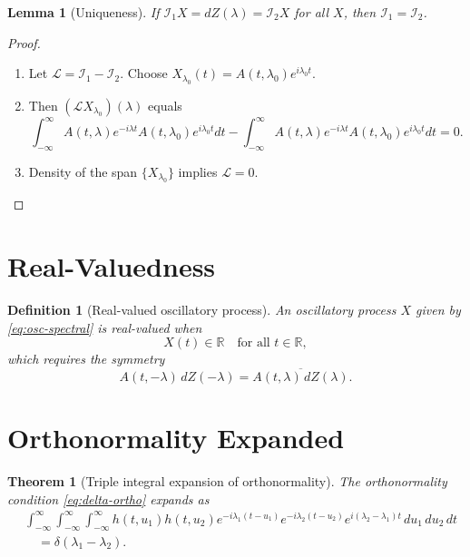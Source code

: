 \documentclass[12pt]{article}
\theoremstyle{plain}
\newtheorem{theorem}{Theorem}
\newtheorem{lemma}{Lemma}
\newtheorem{definition}{Definition}
\begin{document}
\begin{lemma}[Uniqueness]\label{lem:unique}
If $\mathcal{I}_1X = dZ(\lambda) = \mathcal{I}_2X$ for all $X$, then $\mathcal{I}_1=\mathcal{I}_2$.
\end{lemma}

\begin{proof}
\begin{enumerate}
\item Let $\mathcal{L} = \mathcal{I}_1 - \mathcal{I}_2$.  
Choose $X_{\lambda_0}(t) = A(t,\lambda_0)e^{i\lambda_0 t}$.
\item Then $(\mathcal{L}X_{\lambda_0})(\lambda)$ equals
\[
\int_{-\infty}^\infty A(t,\lambda) e^{-i\lambda t}A(t,\lambda_0)e^{i\lambda_0 t} dt -
\int_{-\infty}^\infty A(t,\lambda) e^{-i\lambda t}A(t,\lambda_0)e^{i\lambda_0 t} dt = 0.
\]
\item Density of the span $\{X_{\lambda_0}\}$ implies $\mathcal{L}=0$.
\end{enumerate}
\end{proof}

\section{Real-Valuedness}

\begin{definition}[Real-valued oscillatory process]\label{def:real}
An oscillatory process $X$ given by \eqref{eq:osc-spectral} is real-valued when
\begin{equation}\label{eq:real-cond}
X(t)\in\mathbb{R}\quad\text{for all }t\in\mathbb{R},
\end{equation}
which requires the symmetry
\begin{equation}\label{eq:hermitian}
A(t,-\lambda)\,dZ(-\lambda) = \overline{A(t,\lambda)\,dZ(\lambda)}.
\end{equation}
\end{definition}

\section{Orthonormality Expanded}

\begin{theorem}[Triple integral expansion of orthonormality]
The orthonormality condition \eqref{eq:delta-ortho} expands as
\begin{align}
&\int_{-\infty}^\infty \int_{-\infty}^\infty \int_{-\infty}^\infty h(t,u_1) h(t,u_2) e^{-i\lambda_1(t-u_1)} e^{-i\lambda_2(t-u_2)} e^{i(\lambda_2-\lambda_1)t} \, du_1 \, du_2 \, dt\nonumber\\
&\quad = \delta(\lambda_1-\lambda_2).\label{eq:triple-integral}
\end{align}
\end{theorem}
\end{document}
